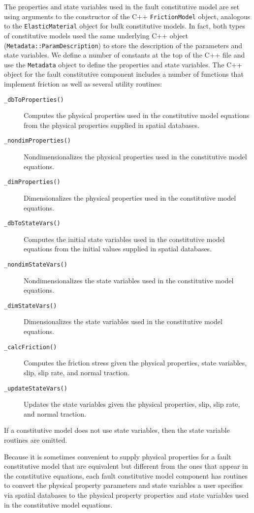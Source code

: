 The properties and state variables used in the fault constitutive
model are set using arguments to the constructor of the C++ \texttt{FrictionModel}
object, analogous to the \texttt{ElasticMaterial} object for bulk
constitutive models. In fact, both types of constitutive models used
the same underlying C++ object (\texttt{Metadata::ParamDescription})
to store the description of the parameters and state variables. We
define a number of constants at the top of the C++ file and use the
\texttt{Metadata} object to define the properties and state variables.
The C++ object for the fault constitutive component includes a number
of functions that implement friction as well as several utility routines:
\begin{description}
\item [{\texttt{\_dbToProperties()}}] Computes the physical properties
used in the constitutive model equations from the physical properties
supplied in spatial databases.
\item [{\texttt{\_nondimProperties()}}] Nondimensionalizes the physical
properties used in the constitutive model equations.
\item [{\texttt{\_dimProperties()}}] Dimensionalizes the physical properties
used in the constitutive model equations.
\item [{\texttt{\_dbToStateVars()}}] Computes the initial state variables
used in the constitutive model equations from the initial values supplied
in spatial databases.
\item [{\texttt{\_nondimStateVars()}}] Nondimensionalizes the state variables
used in the constitutive model equations.
\item [{\texttt{\_dimStateVars()}}] Dimensionalizes the state variables
used in the constitutive model equations.
\item [{\texttt{\_calcFriction()}}] Computes the friction stress given
the physical properties, state variables, slip, slip rate, and normal
traction.
\item [{\texttt{\_updateStateVars()}}] Updates the state variables given
the physical properties, slip, slip rate, and normal traction.
\end{description}
If a constitutive model does not use state variables, then the state
variable routines are omitted. 

Because it is sometimes convenient to supply physical properties for
a fault constitutive model that are equivalent but different from
the ones that appear in the constitutive equations, each fault constitutive
model component has routines to convert the physical property parameters
and state variables a user specifies via spatial databases to the
physical property properties and state variables used in the constitutive
model equations. 

